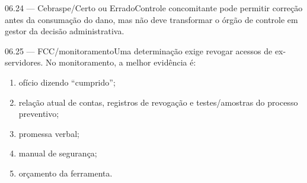 \begin{questao}{ 06.24 — Cebraspe/Certo ou Errado}Controle concomitante pode permitir correção antes da consumação do dano, mas não deve transformar o órgão de controle em gestor da decisão administrativa.\end{questao}
\begin{questao}{ 06.25 — FCC/monitoramento}Uma determinação exige revogar acessos de ex-servidores. No monitoramento, a melhor evidência é:\begin{enumerate}[label=\Alph*)]\item ofício dizendo ``cumprido'';\item relação atual de contas, registros de revogação e testes/amostras do processo preventivo;\item promessa verbal;\item manual de segurança;\item orçamento da ferramenta.\end{enumerate}\end{questao}

